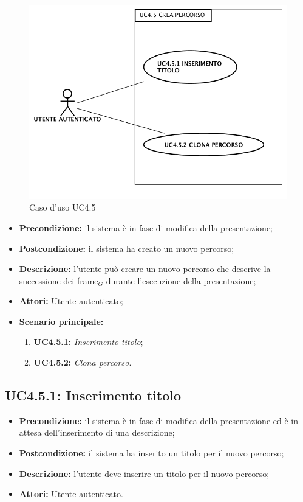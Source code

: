 \begin{figure}[H]
	\begin{center}
	\includegraphics[scale=0.4]{diagram/UC4-5.png}
	\caption{Caso d'uso UC4.5}
	\end{center}
\end{figure}
\begin{itemize}
	\item \textbf{Precondizione:} il sistema è in fase di modifica della presentazione;
	\item \textbf{Postcondizione:} il sistema ha creato un nuovo percorso;
	\item \textbf{Descrizione:} l'utente può creare un nuovo percorso che descrive la successione dei frame$_G$ durante l'esecuzione della presentazione;
	\item \textbf{Attori:} Utente autenticato;
	\item \textbf{Scenario principale:}
	\begin{enumerate}
		\item \textbf{ UC4.5.1:} \textit{ Inserimento titolo};
		\item \textbf{ UC4.5.2:} \textit{ Clona percorso}.
	\end{enumerate}
\end{itemize}
\subsection{ UC4.5.1: Inserimento titolo}

\begin{itemize}
	\item \textbf{Precondizione:} il sistema è in fase di modifica della presentazione ed è in attesa dell'inserimento di una descrizione;
	\item \textbf{Postcondizione:} il sistema ha inserito un titolo per il nuovo percorso;
	\item \textbf{Descrizione:} l'utente deve inserire un titolo per il nuovo percorso;
	\item \textbf{Attori:} Utente autenticato.
\end{itemize}
